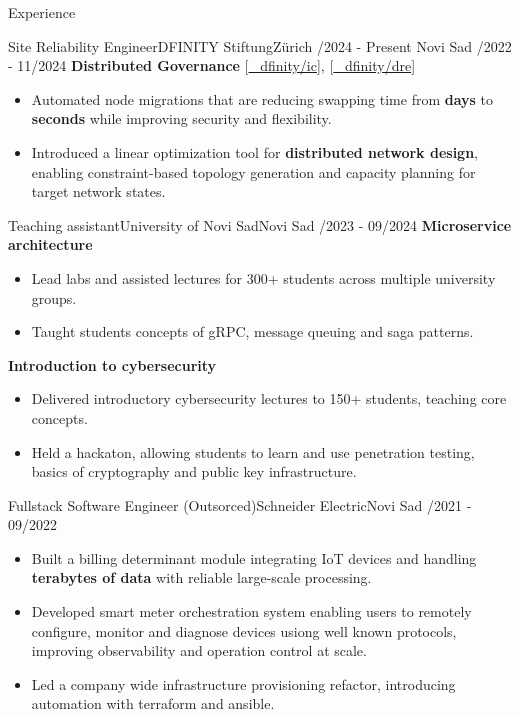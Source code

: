 \documentclass[]{mcdowellcv}
\begin{document}
\begin{cvsection}{Experience}
\begin{cvsubsection}{Site Reliability Engineer}{DFINITY Stiftung}{Zürich /2024 - Present \linebreak Novi Sad /2022 - 11/2024}
    \textbf{Distributed Governance} \hfill [\href{https://github.com/dfinity/ic}{\faGithub ~\hspace{0.1em} dfinity/ic}], [\href{https://github.com/dfinity/dre}{\faGithub ~\hspace{0.1em} dfinity/dre}]
        \begin{itemize}
            \item Automated node migrations that are reducing swapping time from \textbf{days} to \textbf{seconds} while improving security and flexibility.
            \item Introduced a linear optimization tool for \textbf{distributed network design}, enabling constraint-based topology generation and capacity planning for target network states.
        \end{itemize}
    \end{cvsubsection}

    \begin{cvsubsection}{Teaching assistant}{University of Novi Sad}{Novi Sad /2023 - 09/2024}
        \textbf{Microservice architecture}
        \begin{itemize}
            \item Lead labs and assisted lectures for 300+ students across multiple university groups.
            \item Taught students concepts of gRPC, message queuing and saga patterns.
        \end{itemize}
        \textbf{Introduction to cybersecurity} 
        \begin{itemize}
            \item Delivered introductory cybersecurity lectures to 150+ students, teaching core concepts.
            \item Held a hackaton, allowing students to learn and use penetration testing, basics of cryptography and public key infrastructure.
        \end{itemize}
    \end{cvsubsection}
 
    
    \begin{cvsubsection}{Fullstack Software Engineer (Outsorced)}{Schneider Electric}{Novi Sad /2021 - 09/2022}
        \begin{itemize}
            \item Built a billing determinant module integrating IoT devices and handling \textbf{terabytes of data} with reliable large-scale processing.
            \item Developed smart meter orchestration system enabling users to remotely configure, monitor and diagnose devices usiong well known protocols, improving observability and operation control at scale.
            \item Led a company wide infrastructure provisioning refactor, introducing automation with terraform and ansible. 
        \end{itemize}
    

\end{cvsubsection}
\end{cvsection}
\end{document}
